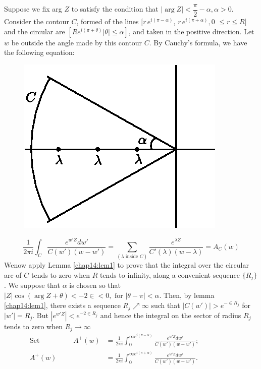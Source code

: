 Suppose we fix arg $Z$ to satisfy the condition that $|\arg Z| <
\dfrac{\pi}{2} - \alpha, \alpha > 0$. Consider the contour $C$,
formed of the lines $[r\, e^{i (\pi - \alpha )}$, $r \,e^{i(\pi + \alpha )},
 0$ $\le r \le R ]$ and the circular are $[R e^{i (\pi + \theta)}
 |\theta| \le \alpha ]$, and taken in the positive direction. Let
$w$ be outside the angle made by this contour $C$. By Cauchy's
formula, we have the following equation: 
 \begin{figure}[H]
 \centerline{\includegraphics{vol15-figures/fig15-13.eps}}
 \end{figure}
$$
\frac{1}{2 \pi i} \int_C \frac{e^{w'Z} dw'}{C(w') (w-w')} =
\sum_{(\lambda \text{ inside } C)} \frac{e^{\lambda Z}}{C' (\lambda) (w-
 \lambda)} = A_C (w) 
$$
We\pageoriginale now apply Lemma \ref{chap14:lem1} to prove that the integral over the circular
arc of $C$ tends to zero when $R$ tends to infinity, along a
convenient sequence $\{ R_j\}$. We suppose that $\alpha$ is chosen so
that $|Z| \cos (\arg Z +\theta) < -2 \in < 0, \text{ for }
|\theta-\pi| < \alpha $. Then, by lemma \ref{chap14:lem1}, there exists a sequence
$R_j \nearrow \infty$ such that $|C (w')| > e^{- \in R_j}$
for $|w'| = R_j$. But $|e^{w'Z}| < e^{-2 \in R_j}$ and hence
the integral on the sector of radius $R_j $ tends to zero when $R_j
\to \infty$ 
\begin{align*}
 \text{Set}\hspace{2cm} A^+{(w)} & = \frac{1}{2 \pi i} \int_0^{\infty e^{i(\pi -
   \alpha )}} \frac{e^{w'Z} dw'} { C(w') (w-w')}; \hspace{2cm}\\ 
 A^+{(w)} & = \frac{1}{2 \pi i} \int_0^{\infty e^{i(\pi +
   \alpha)}} \frac{e^{w'Z} dw'} { C(w') (w-w')}. 
\end{align*}

